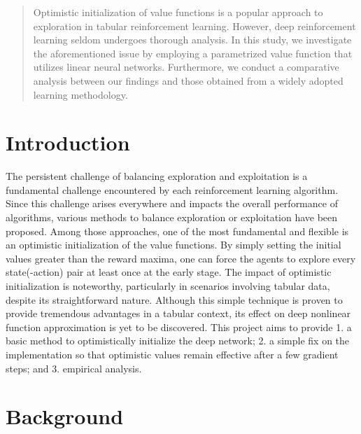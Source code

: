 \documentclass{article}
\theoremstyle{plain}
\theoremstyle{definition}
\theoremstyle{remark}
\begin{document}
\begin{abstract}
Optimistic initialization of value functions \citep{Ando2007} is a popular approach to exploration in tabular reinforcement learning. However, deep reinforcement learning seldom undergoes thorough analysis. In this study, we investigate the aforementioned issue by employing a parametrized value function that utilizes linear neural networks. Furthermore, we conduct a comparative analysis between our findings and those obtained from a widely adopted learning methodology.
\end{abstract}

\section{Introduction}
The persistent challenge of balancing exploration and exploitation is a fundamental challenge encountered by each reinforcement learning algorithm. Since this challenge arises everywhere and impacts the overall performance of algorithms, various methods to balance exploration or exploitation have been proposed. Among those approaches, one of the most fundamental and flexible is an optimistic initialization of the value functions. By simply setting the initial values greater than the reward maxima, one can force the agents to explore every state(-action) pair at least once at the early stage. The impact of optimistic initialization is noteworthy, particularly in scenarios involving tabular data, despite its straightforward nature. Although this simple technique is proven to provide tremendous advantages in a tabular context, its effect on deep nonlinear function approximation is yet to be discovered. This project aims to provide 1. a basic method to optimistically initialize the deep network; 2. a simple fix on the implementation so that optimistic values remain effective after a few gradient steps; and 3. empirical analysis.



\medskip
\section{Background}
\end{document}
